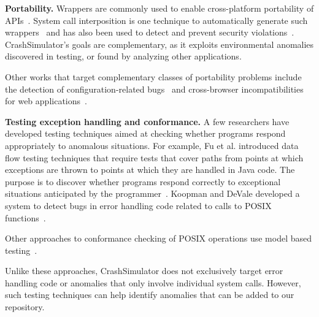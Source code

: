 \noindent
{\bf Portability.}
Wrappers are commonly used to enable cross-platform portability of
APIs~\cite{bartolomeicompliance}. System call interposition is one
technique to automatically generate such
wrappers~\cite{Guo:2011:CUS:2002181.2002202} and has also been used to
detect and prevent security
violations~\cite{Hofmeyr:1998:IDU:1298081.1298084,
Acharya:2000:MUP:1251306.1251307}.  CrashSimulator's goals are
complementary, as it exploits environmental anomalies discovered in
testing, or found by analyzing other applications.

Other works that target complementary classes of portability problems
include the detection of configuration-related bugs~\cite{skoll:icse:2004,
Yilmaz:issta:2004, Fouche:issta:2009, Kastner12, Nguyen14} and
cross-browser incompatibilities for web
applications~\cite{DBLP:conf/icsm/ChoudharyVO10, silakov2010improving,
DBLP:conf/icse/Choudhary11, Mesbah:2011:ACC:1985793.1985870,
DBLP:conf/icst/DallmeierP0MZ14}.


\noindent
{\bf Testing exception handling and conformance.}
A few researchers have developed testing techniques aimed at checking
whether programs respond appropriately to anomalous situations.  For
example, Fu et al. introduced data flow testing techniques that require
tests that cover paths from points at which exceptions are thrown to points
at which they are handled in Java code. The purpose is to discover whether
programs respond correctly to exceptional situations anticipated by the
programmer~\cite{DBLP:journals/tse/FuMRW05}.  Koopman and DeVale developed
a system to detect bugs in error handling code related to calls to POSIX
functions~\cite{Koopman00theexception}.

Other approaches to conformance checking of POSIX operations use model
based testing~\cite{Dadeau:2008:CSM:1433121.1433137,Farchi02}.

Unlike these approaches, CrashSimulator does not exclusively target error
handling code or anomalies that only involve individual system calls.
However, such testing techniques can help identify anomalies that can be
added to our repository.




